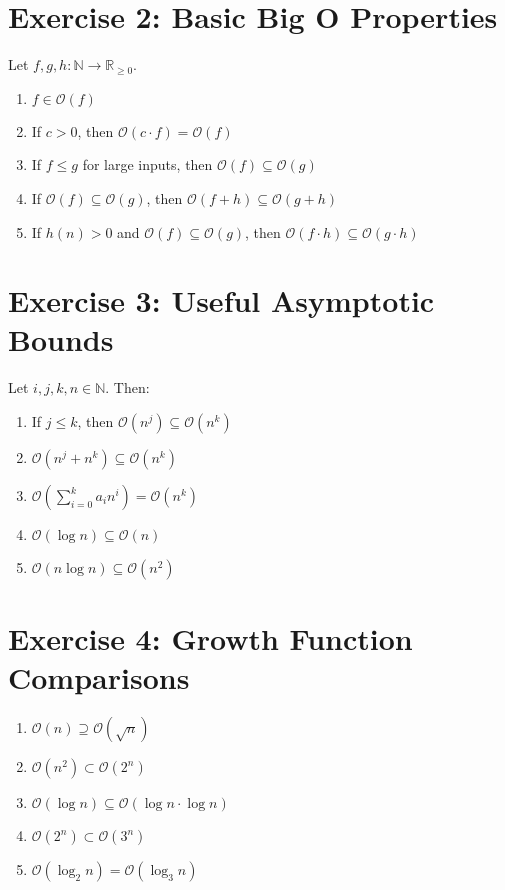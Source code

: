 \documentclass{article}
\begin{document}
\section*{Exercise 2: Basic Big O Properties}
Let \( f, g, h : \mathbb{N} \to \mathbb{R}_{\ge 0} \).
\begin{enumerate}
    \item \( f \in \mathcal{O}(f) \)
    \item If \( c > 0 \), then \( \mathcal{O}(c \cdot f) = \mathcal{O}(f) \)
    \item If \( f \le g \) for large inputs, then \( \mathcal{O}(f) \subseteq \mathcal{O}(g) \)
    \item If \( \mathcal{O}(f) \subseteq \mathcal{O}(g) \), then \( \mathcal{O}(f + h) \subseteq \mathcal{O}(g + h) \)
    \item If \( h(n) > 0 \) and \( \mathcal{O}(f) \subseteq \mathcal{O}(g) \), then \( \mathcal{O}(f \cdot h) \subseteq \mathcal{O}(g \cdot h) \)
\end{enumerate}

\section*{Exercise 3: Useful Asymptotic Bounds}
Let \( i, j, k, n \in \mathbb{N} \). Then:
\begin{enumerate}
    \item If \( j \le k \), then \( \mathcal{O}(n^j) \subseteq \mathcal{O}(n^k) \)
    \item \( \mathcal{O}(n^j + n^k) \subseteq \mathcal{O}(n^k) \)
    \item \( \mathcal{O}\left(\sum_{i=0}^{k} a_i n^i\right) = \mathcal{O}(n^k) \)
    \item \( \mathcal{O}(\log n) \subseteq \mathcal{O}(n) \)
    \item \( \mathcal{O}(n \log n) \subseteq \mathcal{O}(n^2) \)
\end{enumerate}

\section*{Exercise 4: Growth Function Comparisons}
\begin{enumerate}
    \item \( \mathcal{O}(n) \supseteq \mathcal{O}(\sqrt{n}) \)
    \item \( \mathcal{O}(n^2) \subset \mathcal{O}(2^n) \)
    \item \( \mathcal{O}(\log n) \subseteq \mathcal{O}(\log n \cdot \log n) \)
    \item \( \mathcal{O}(2^n) \subset \mathcal{O}(3^n) \)
    \item \( \mathcal{O}(\log_2 n) = \mathcal{O}(\log_3 n) \)
\end{enumerate}
\end{document}
